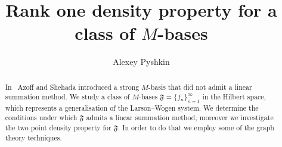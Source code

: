 \documentclass[12pt]{amsart}
\begin{document}
  \title{Rank one density property for a class of $M$-bases}
  \author{Alexey Pyshkin}
  \begin{abstract}
    In~\cite{azoff} Azoff and Shehada introduced a strong $M$-basis that did not admit a linear summation method.
    We study a class of $M$-bases $\mathfrak{F}=\{f_n\}_{n=1}^\infty$ in the Hilbert space, which
      represents a generalisation of the Larson--Wogen system.
    We determine the conditions under which $\mathfrak{F}$ admits a linear summation method, moreover
      we investigate the two point density property for $\mathfrak{F}$.
    In order to do that we employ some of the graph theory techniques.
  \end{abstract}
  \maketitle
\end{document}
